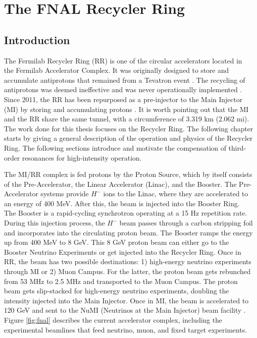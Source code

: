 \chapter{The FNAL Recycler Ring}
\label{sec:ch3}

\section{\label{sec:intro31}Introduction}
The Fermilab Recycler Ring (RR) is one of the circular accelerators located in the Fermilab Accelerator Complex. It was originally designed to store and accumulate antiprotons that remained from a Tevatron event \cite{rr0}. The recycling of antiprotons was deemed ineffective and was never operationally implemented \cite{rrnagaitsev}. Since 2011, the RR has been repurposed as a pre-injector to the Main Injector (MI) by storing and accumulating protons \cite{rr1}. It is worth pointing out that the MI and the RR share the same tunnel, with a circumference of 3.319 km (2.062 mi). The work done for this thesis focuses on the Recycler Ring. The following chapter starts by giving a general description of the operation and physics of the Recycler Ring. The following sections introduce and motivate the compensation of third-order resonances for high-intensity operation.  

The MI/RR complex is fed protons by the Proton Source, which by itself consists of the Pre-Accelerator, the Linear Accelerator (Linac), and the Booster. The Pre-Accelerator systems provide $H^-$ ions to the Linac, where they are accelerated to an energy of 400 MeV. After this, the beam is injected into the Booster Ring. The Booster is a rapid-cycling synchrotron operating at a 15 Hz repetition rate. During this injection process, the $H^-$ beam passes through a carbon stripping foil and incorporates into the circulating proton beam. The Booster ramps the energy up from 400 MeV to 8 GeV. This 8 GeV proton beam can either go to the Booster Neutrino Experiments or get injected into the Recycler Ring. Once in RR, the beam has two possible destinations: 1) high-energy neutrino experiments through MI or 2) Muon Campus. For the latter, the proton beam gets rebunched from 53 MHz to 2.5 MHz and transported to the Muon Campus. The proton beam gets slip-stacked for high-energy neutrino experiments, doubling the intensity injected into the Main Injector. Once in MI, the beam is accelerated to 120 GeV and sent to the NuMI (Neutrinos at the Main Injector) beam facility \cite{rr1, rrnagaitsev, numi1}. Figure \ref{fig:fnal} describes the current accelerator complex, including the experimental beamlines that feed neutrino, muon, and fixed target experiments.

